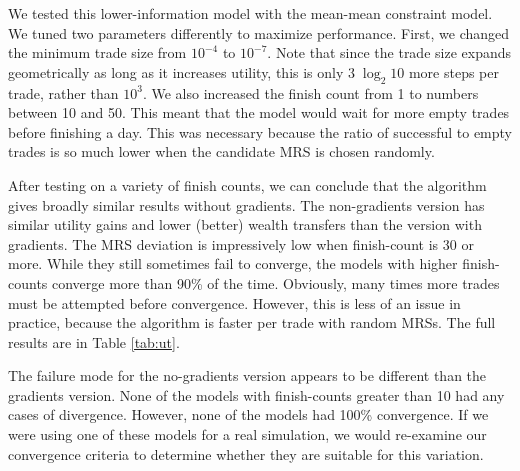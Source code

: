 \documentclass[12pt,a4paper,titlepage]{article}
\newcommand{\co}[1]{\textsf{#1}}
\begin{document}
We tested this lower-information model with the \co{mean}-\co{mean} constraint model.
We tuned two parameters differently to maximize performance. 
First, we changed the minimum trade size from $10^{-4}$ to $10^{-7}$.
Note that since the trade size expands geometrically as long as it increases utility, this is only $3 \; \log_2 10$ more steps per trade, rather than $10^3$.
We also increased the finish count from 1 to numbers between 10 and 50.
This meant that the model would wait for more empty trades before finishing a day.
This was necessary because the ratio of successful to empty trades is so much lower when the candidate MRS is chosen randomly.

After testing on a variety of finish counts, we can conclude that the algorithm gives broadly similar results without gradients. 
The non-gradients version has similar utility gains and lower (better) wealth transfers than the version with gradients.
The MRS deviation is impressively low when finish-count is 30 or more.
While they still sometimes fail to converge, the models with higher finish-counts converge more than 90\% of the time.
Obviously, many times more trades must be attempted before convergence.
However, this is less of an issue in practice, because the algorithm is faster per trade with random MRSs.
The full results are in Table \ref{tab:ut}.

The failure mode for the no-gradients version appears to be different than the gradients version.
None of the models with finish-counts greater than 10 had any cases of divergence.
However, none of the models had 100\% convergence.
If we were using one of these models for a real simulation, we would re-examine our convergence criteria to determine whether they are suitable for this variation.
\end{document}
